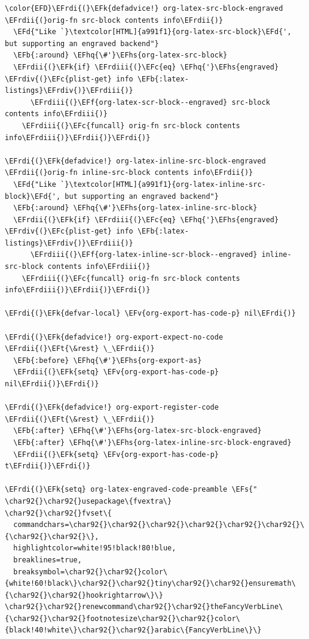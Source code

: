 \documentclass{scrartcl}
\newcommand{\EFk}[1]{\textcolor{EFk}{#1}} %
\newcommand{\EFd}[1]{\textcolor{EFd}{#1}} %
\newcommand{\EFt}[1]{\textcolor{EFt}{#1}} %
\newcommand{\EFs}[1]{\textcolor{EFs}{#1}} %
\newcommand{\EFb}[1]{\textcolor{EFb}{#1}} %
\newcommand{\EFc}[1]{\textcolor{EFc}{#1}} %
\newcommand{\EFv}[1]{\textcolor{EFv}{#1}} %
\newcommand{\EFf}[1]{\textcolor{EFf}{#1}} %
\newcommand{\EFhq}[1]{#1} %
\newcommand{\EFhs}[1]{#1} %
\newcommand{\EFrdi}[1]{#1} %
\newcommand{\EFrdii}[1]{#1} %
\newcommand{\EFrdiii}[1]{#1} %
\newcommand{\EFrdiv}[1]{#1} %
\begin{document}
\begin{Code}
\begin{Verbatim}[]
\color{EFD}\EFrdi{(}\EFk{defadvice!} org-latex-src-block-engraved \EFrdii{(}orig-fn src-block contents info\EFrdii{)}
  \EFd{"Like `}\textcolor[HTML]{a991f1}{org-latex-src-block}\EFd{', but supporting an engraved backend"}
  \EFb{:around} \EFhq{\#'}\EFhs{org-latex-src-block}
  \EFrdii{(}\EFk{if} \EFrdiii{(}\EFc{eq} \EFhq{'}\EFhs{engraved} \EFrdiv{(}\EFc{plist-get} info \EFb{:latex-listings}\EFrdiv{)}\EFrdiii{)}
      \EFrdiii{(}\EFf{org-latex-scr-block--engraved} src-block contents info\EFrdiii{)}
    \EFrdiii{(}\EFc{funcall} orig-fn src-block contents info\EFrdiii{)}\EFrdii{)}\EFrdi{)}

\EFrdi{(}\EFk{defadvice!} org-latex-inline-src-block-engraved \EFrdii{(}orig-fn inline-src-block contents info\EFrdii{)}
  \EFd{"Like `}\textcolor[HTML]{a991f1}{org-latex-inline-src-block}\EFd{', but supporting an engraved backend"}
  \EFb{:around} \EFhq{\#'}\EFhs{org-latex-inline-src-block}
  \EFrdii{(}\EFk{if} \EFrdiii{(}\EFc{eq} \EFhq{'}\EFhs{engraved} \EFrdiv{(}\EFc{plist-get} info \EFb{:latex-listings}\EFrdiv{)}\EFrdiii{)}
      \EFrdiii{(}\EFf{org-latex-inline-scr-block--engraved} inline-src-block contents info\EFrdiii{)}
    \EFrdiii{(}\EFc{funcall} orig-fn src-block contents info\EFrdiii{)}\EFrdii{)}\EFrdi{)}

\EFrdi{(}\EFk{defvar-local} \EFv{org-export-has-code-p} nil\EFrdi{)}

\EFrdi{(}\EFk{defadvice!} org-export-expect-no-code \EFrdii{(}\EFt{\&rest} \_\EFrdii{)}
  \EFb{:before} \EFhq{\#'}\EFhs{org-export-as}
  \EFrdii{(}\EFk{setq} \EFv{org-export-has-code-p} nil\EFrdii{)}\EFrdi{)}

\EFrdi{(}\EFk{defadvice!} org-export-register-code \EFrdii{(}\EFt{\&rest} \_\EFrdii{)}
  \EFb{:after} \EFhq{\#'}\EFhs{org-latex-src-block-engraved}
  \EFb{:after} \EFhq{\#'}\EFhs{org-latex-inline-src-block-engraved}
  \EFrdii{(}\EFk{setq} \EFv{org-export-has-code-p} t\EFrdii{)}\EFrdi{)}

\EFrdi{(}\EFk{setq} org-latex-engraved-code-preamble \EFs{"
\char92{}\char92{}usepackage\{fvextra\}
\char92{}\char92{}fvset\{
  commandchars=\char92{}\char92{}\char92{}\char92{}\char92{}\char92{}\{\char92{}\char92{}\},
  highlightcolor=white!95!black!80!blue,
  breaklines=true,
  breaksymbol=\char92{}\char92{}color\{white!60!black\}\char92{}\char92{}tiny\char92{}\char92{}ensuremath\{\char92{}\char92{}hookrightarrow\}\}
\char92{}\char92{}renewcommand\char92{}\char92{}theFancyVerbLine\{\char92{}\char92{}footnotesize\char92{}\char92{}color\{black!40!white\}\char92{}\char92{}arabic\{FancyVerbLine\}\}


\end{Verbatim}
\end{Code}
\end{document}
